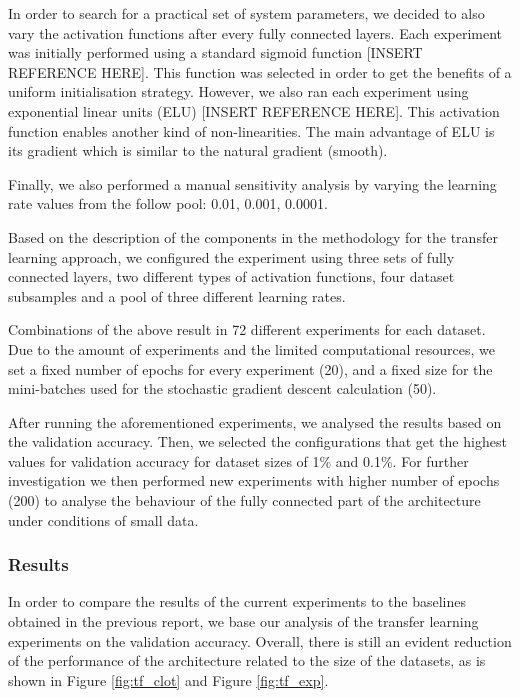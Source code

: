 \documentclass{article}
\begin{document}
In order to search for a practical set of system parameters, we decided to also vary the activation functions after every fully connected layers. Each experiment was initially performed using a standard sigmoid function [INSERT REFERENCE HERE]. This function was selected in order to get the benefits of a uniform initialisation strategy. However, we also ran each experiment using exponential linear units (ELU) [INSERT REFERENCE HERE]. This activation function enables another kind of non-linearities. The main advantage of ELU is its gradient which is similar to the natural gradient (smooth).

Finally, we also performed a manual sensitivity analysis by varying the learning rate values from the follow pool: 0.01, 0.001, 0.0001.

Based on the description of the components in the methodology for the transfer learning approach, we configured the experiment using three sets of fully connected layers, two different types of activation functions, four dataset subsamples and a pool of three different learning rates.

Combinations of the above result in 72 different experiments for each dataset. Due to the amount of experiments and the limited computational resources, we set a fixed number of epochs for every experiment (20), and a fixed size for the mini-batches used for the stochastic gradient descent calculation (50).

After running the aforementioned experiments, we analysed the results based on the validation accuracy. Then, we selected the configurations that get the highest values for validation accuracy for dataset sizes of 1\% and 0.1\%. For further investigation we then performed new experiments with higher number of epochs (200) to analyse the behaviour of the fully connected part of the architecture under conditions of small data.

\subsubsection{\textbf{Results}}

In order to compare the results of the current experiments to the baselines obtained in the previous report, we base our analysis of the transfer learning experiments on the validation accuracy. Overall, there is still an evident reduction of the performance of the architecture related to the size of the datasets, as is shown in Figure \ref{fig:tf_clot} and Figure \ref{fig:tf_exp}.
\end{document}
